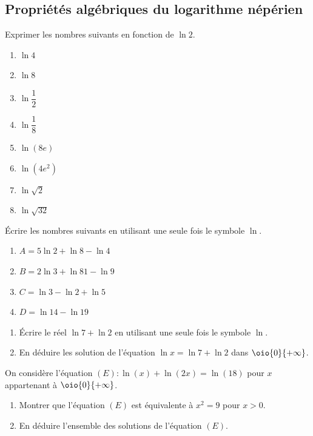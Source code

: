 \documentclass[a4paper,11pt,exos]{nsi} %
\begin{document}
\subsection*{Propriétés algébriques du logarithme népérien}
\exo{}
Exprimer les nombres suivants en fonction de $\ln 2$.
\begin{multicols}{4}
    \begin{enumerate}
        \item $\ln 4$
        \item $\ln 8$
        \item $\ln \dfrac{1}{2}$
        \item $\ln \dfrac{1}{8}$
        \item $\ln (8e)$
        \item $\ln \left(4e^2\right)$
        \item $\ln \sqrt{2}$
        \item $\ln \sqrt{32}$
    \end{enumerate}
\end{multicols}

\exo{}
Écrire les nombres suivants en utilisant une seule fois le symbole $\ln$.
\begin{multicols}{2}
    \begin{enumerate}
        \item $A= 5\ln 2+\ln 8-\ln 4$
        \item $B=2\ln 3+\ln 81-\ln 9$
        \item $C=\ln 3-\ln 2+\ln 5$
        \item $D=\ln 14-\ln 19$
    \end{enumerate}
\end{multicols}

\exo{}
\begin{enumerate}
    \item Écrire le réel $\ln 7 +\ln 2$ en utilisant une seule fois le symbole $\ln$.
    \item En déduire les solution de l'équation $\ln x=\ln 7 +\ln 2$ dans $\oio{0}{+\infty}$.
\end{enumerate}

\exo{}
On considère l'équation $(E) : \ln(x)+ \ln(2x)=\ln(18)$ pour $x$ appartenant à $\oio{0}{+\infty}$.
\begin{enumerate}
    \item Montrer que l'équation $(E)$ est équivalente à $x^2=9$ pour $x>0$.
    \item En déduire l'ensemble des solutions de l'équation $(E)$.
\end{enumerate}
\end{document}
